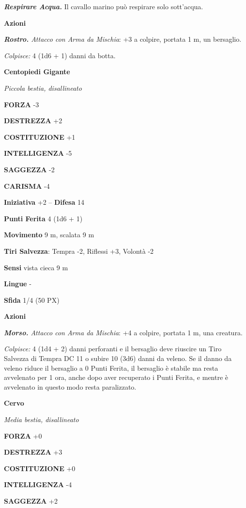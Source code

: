 \begin{multicols}{2}
	\textit{\textbf{Respirare Acqua.}} Il cavallo marino può respirare solo sott'acqua.

	\textbf{Azioni}

	\textit{\textbf{Rostro.} Attacco con Arma da Mischia}: +3 a colpire, portata 1 m, un bersaglio.

	\textit{Colpisce:} 4 (1d6 + 1) danni da botta.

	\medskip\textbf{Centopiedi Gigante}

	\textit{Piccola bestia, disallineato}

	\textbf{FORZA} -3

	\textbf{DESTREZZA} +2

	\textbf{COSTITUZIONE} +1

	\textbf{INTELLIGENZA} -5

	\textbf{SAGGEZZA} -2

	\textbf{CARISMA} -4

	\textbf{Iniziativa} +2 -- \textbf{Difesa} 14

	\textbf{Punti Ferita} 4 (1d6 + 1)

	\textbf{Movimento} 9 m, scalata 9 m

	\textbf{Tiri Salvezza}: Tempra -2, Riflessi +3, Volontà -2

	\textbf{Sensi} vista cieca 9 m

	\textbf{Lingue} -

	\textbf{Sfida} 1/4 (50 PX)

	\textbf{Azioni}

	\textit{\textbf{Morso.} Attacco con Arma da Mischia}: +4 a colpire, portata 1 m, una creatura.

	\textit{Colpisce:} 4 (1d4 + 2) danni perforanti e il bersaglio deve riuscire un Tiro Salvezza di Tempra DC 11 o subire 10 (3d6) danni da veleno. Se il danno da veleno riduce il bersaglio a 0 Punti Ferita, il bersaglio è stabile ma resta avvelenato per 1 ora, anche dopo aver recuperato i Punti Ferita, e mentre è avvelenato in questo modo resta paralizzato.

	\medskip\textbf{Cervo}

	\textit{Media bestia, disallineato}

	\textbf{FORZA} +0

	\textbf{DESTREZZA} +3

	\textbf{COSTITUZIONE} +0

	\textbf{INTELLIGENZA} -4

	\textbf{SAGGEZZA} +2


\end{multicols}
